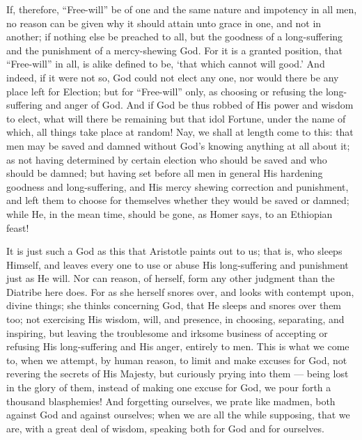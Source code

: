 If, therefore, “Free-will” be of one and the same nature and impotency in all men, no reason can be given why it should attain unto grace in one, and not in another; if nothing else be preached to all, but the goodness of a long-suffering and the punishment of a mercy-shewing God. For it is a granted position, that “Free-will” in all, is alike defined to be, ‘that which cannot will good.’ And indeed, if it were not so, God could not elect any one, nor would there be any place left for Election; but for “Free-will” only, as choosing or refusing the long-suffering and anger of God. And if God be thus robbed of His power and wisdom to elect, what will there be remaining but that idol Fortune, under the name of which, all things take place at random! Nay, we shall at length come to this: that men may be saved and damned without God’s knowing anything at all about it; as not having determined by certain election who should be saved and who should be damned; but having set before all men in general His hardening goodness and long-suffering, and His mercy shewing correction and punishment, and left them to choose for themselves whether they would be saved or damned; while He, in the mean time, should be gone, as Homer says, to an Ethiopian feast!

It is just such a God as this that Aristotle paints out to us; that is, who sleeps Himself, and leaves every one to use or abuse His long-suffering and punishment just as He will. Nor can reason, of herself, form any other judgment than the Diatribe here does. For as she herself snores over, and looks with contempt upon, divine things; she thinks concerning God, that He sleeps and snores over them too; not exercising His wisdom, will, and presence, in choosing, separating, and inspiring, but leaving the troublesome and irksome business of accepting or refusing His long-suffering and His anger, entirely to men. This is what we come to, when we attempt, by human reason, to limit and make excuses for God, not revering the secrets of His Majesty, but curiously prying into them — being lost in the glory of them, instead of making one excuse for God, we pour forth a thousand blasphemies! And forgetting ourselves, we prate like madmen, both against God and against ourselves; when we are all the while supposing, that we are, with a great deal of wisdom, speaking both for God and for ourselves.

